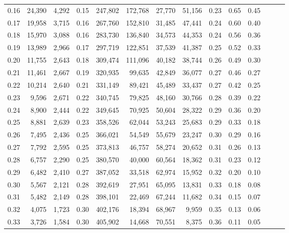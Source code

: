 \begin{tabular}{rrrrrrrrrrrrrr}
0.16 &  24,390 &  4,292 &  0.15 &  247,802 &  172,768 &  27,770 &  51,156 &  0.23 &  0.65 &      0.45 \\
0.17 &  19,958 &  3,715 &  0.16 &  267,760 &  152,810 &  31,485 &  47,441 &  0.24 &  0.60 &      0.40 \\
0.18 &  15,970 &  3,088 &  0.16 &  283,730 &  136,840 &  34,573 &  44,353 &  0.24 &  0.56 &      0.36 \\
0.19 &  13,989 &  2,966 &  0.17 &  297,719 &  122,851 &  37,539 &  41,387 &  0.25 &  0.52 &      0.33 \\
0.20 &  11,755 &  2,643 &  0.18 &  309,474 &  111,096 &  40,182 &  38,744 &  0.26 &  0.49 &      0.30 \\
0.21 &  11,461 &  2,667 &  0.19 &  320,935 &   99,635 &  42,849 &  36,077 &  0.27 &  0.46 &      0.27 \\
0.22 &  10,214 &  2,640 &  0.21 &  331,149 &   89,421 &  45,489 &  33,437 &  0.27 &  0.42 &      0.25 \\
0.23 &   9,596 &  2,671 &  0.22 &  340,745 &   79,825 &  48,160 &  30,766 &  0.28 &  0.39 &      0.22 \\
0.24 &   8,900 &  2,444 &  0.22 &  349,645 &   70,925 &  50,604 &  28,322 &  0.29 &  0.36 &      0.20 \\
0.25 &   8,881 &  2,639 &  0.23 &  358,526 &   62,044 &  53,243 &  25,683 &  0.29 &  0.33 &      0.18 \\
0.26 &   7,495 &  2,436 &  0.25 &  366,021 &   54,549 &  55,679 &  23,247 &  0.30 &  0.29 &      0.16 \\
0.27 &   7,792 &  2,595 &  0.25 &  373,813 &   46,757 &  58,274 &  20,652 &  0.31 &  0.26 &      0.13 \\
0.28 &   6,757 &  2,290 &  0.25 &  380,570 &   40,000 &  60,564 &  18,362 &  0.31 &  0.23 &      0.12 \\
0.29 &   6,482 &  2,410 &  0.27 &  387,052 &   33,518 &  62,974 &  15,952 &  0.32 &  0.20 &      0.10 \\
0.30 &   5,567 &  2,121 &  0.28 &  392,619 &   27,951 &  65,095 &  13,831 &  0.33 &  0.18 &      0.08 \\
0.31 &   5,482 &  2,149 &  0.28 &  398,101 &   22,469 &  67,244 &  11,682 &  0.34 &  0.15 &      0.07 \\
0.32 &   4,075 &  1,723 &  0.30 &  402,176 &   18,394 &  68,967 &   9,959 &  0.35 &  0.13 &      0.06 \\
0.33 &   3,726 &  1,584 &  0.30 &  405,902 &   14,668 &  70,551 &   8,375 &  0.36 &  0.11 &      0.05 \\

\end{tabular}
